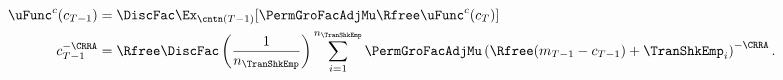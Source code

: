   \begin{equation}\begin{gathered}\begin{aligned}
        \uFunc^{c}(c_{T-1})       & = \DiscFac \Ex_{\cntn(T-1)} [\PermGroFacAdjMu\Rfree \uFunc^{c}(c_{T})]  %
        \\      c_{T-1}^{-\CRRA}   & = \Rfree \DiscFac \left(\frac{1}{n_{\TranShkEmp}}\right) \sum_{i=1}^{n_{\TranShkEmp}} \PermGroFacAdjMu\left(\Rfree (m_{T-1}-c_{T-1}) + \TranShkEmp_{i}\right)^{-\CRRA} \label{eq:FOCTm1}.
      \end{aligned}\end{gathered}\end{equation}
